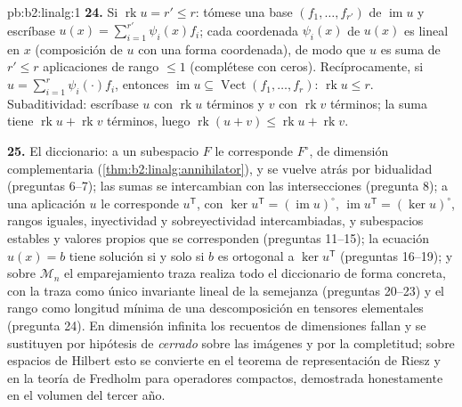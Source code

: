 \begin{solution}{pb:b2:linalg:1}
\textbf{24.} Si $\operatorname{rk} u = r' \leq r$: tómese una base
$(f_1, \dots, f_{r'})$ de $\operatorname{im} u$ y escríbase $u(x)
= \sum_{i=1}^{r'} \psi_i(x) f_i$; cada coordenada $\psi_i(x)$ de
$u(x)$ es lineal en $x$ (composición de $u$ con una forma
coordenada), de modo que $u$ es suma de $r' \leq r$ aplicaciones
de rango $\leq 1$ (complétese con ceros).
Recíprocamente, si $u = \sum_{i=1}^r \psi_i(\cdot)f_i$, entonces
$\operatorname{im} u \subseteq \operatorname{Vect}(f_1, \dots,
f_r)$: $\operatorname{rk} u \leq r$. Subaditividad: escríbase $u$
con $\operatorname{rk} u$ términos y $v$ con $\operatorname{rk} v$
términos; la suma tiene $\operatorname{rk} u + \operatorname{rk}
v$ términos, luego $\operatorname{rk}(u + v) \leq \operatorname{rk}
u + \operatorname{rk} v$.

\textbf{25.} El diccionario: a un subespacio $F$ le corresponde
$F^\circ$, de dimensión complementaria
(\cref{thm:b2:linalg:annihilator}), y se vuelve atrás por
bidualidad (preguntas 6--7); las sumas se intercambian con las
intersecciones (pregunta 8); a una aplicación $u$ le corresponde
$u^{\mathsf T}$, con $\ker u^{\mathsf T} =
(\operatorname{im}u)^\circ$, $\operatorname{im}u^{\mathsf T} =
(\ker u)^\circ$, rangos iguales, inyectividad y sobreyectividad
intercambiadas, y subespacios estables y valores propios que se
corresponden (preguntas 11--15); la ecuación $u(x) = b$ tiene
solución si y solo si $b$ es ortogonal a $\ker u^{\mathsf T}$
(preguntas 16--19); y sobre $\mathcal{M}_n$ el emparejamiento
traza realiza todo el diccionario de forma concreta, con la traza
como único invariante lineal de la semejanza (preguntas 20--23) y
el rango como longitud mínima de una descomposición en tensores
elementales (pregunta 24). En dimensión infinita los recuentos de
dimensiones fallan y se sustituyen por hipótesis de \emph{cerrado}
sobre las imágenes y por la completitud; sobre espacios de Hilbert
esto se convierte en el teorema de representación de Riesz y en la
teoría de Fredholm para operadores compactos, demostrada
honestamente en el volumen del tercer año.
\end{solution}
